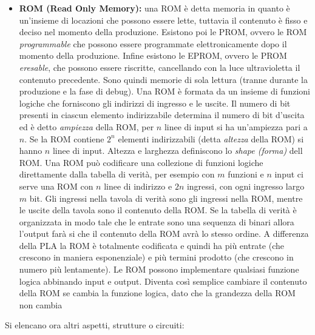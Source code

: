 \documentclass[a4paper,12pt, oneside]{book}
\begin{document}
\begin{itemize}
\item \textbf{ROM (Read Only Memory):} una ROM è detta memoria in quanto è un'insieme di locazioni che possono essere lette, tuttavia il contenuto è fisso e deciso nel momento della produzione. Esistono poi le PROM, ovvero le ROM \textit{programmable} che possono essere programmate elettronicamente dopo il momento della produzione. Infine esistono le EPROM, ovvero le PROM \textit{eresable}, che possono essere riscritte, cancellando con la luce ultravioletta il contenuto precedente. Sono quindi memorie di sola lettura (tranne durante la produzione e la fase di debug). Una ROM è formata da un insieme di funzioni logiche che forniscono gli indirizzi di ingresso e le uscite. Il numero di bit presenti in ciascun elemento indirizzabile  determina il numero di bit d'uscita ed è detto \textit{ampiezza} della ROM, per $n$ linee di input si ha un'ampiezza pari a $n$. Se la ROM contiene $2^n$ elementi indirizzabili (detta \textit{altezza} della ROM) si hanno $n$ linee di input. Altezza e larghezza definiscono lo \textit{shape (forma)} dell ROM. Una ROM può codificare una collezione di funzioni logiche direttamente dalla tabella di verità, per esempio con $m$ funzioni e $n$ input ci serve una ROM con $n$ linee di indirizzo e $2n$ ingressi, con ogni ingresso largo $m$ bit. Gli ingressi nella tavola di verità sono gli ingressi nella ROM, mentre le uscite della tavola sono il contenuto della ROM. Se la tabella di verità è organizzata in modo tale che le entrate sono una sequenza di binari allora l'output farà si che il contenuto della ROM avrà lo stesso ordine. A differenza della PLA la ROM è totalmente codificata e quindi ha più entrate (che crescono in maniera esponenziale) e più termini prodotto (che crescono in numero più lentamente). Le ROM possono implementare qualsiasi funzione logica abbinando input e output. Diventa così semplice cambiare il contenuto della ROM se cambia la funzione logica, dato che la grandezza della ROM non cambia
\end{itemize}
\newpage
Si elencano ora altri aspetti, strutture o circuiti:
\end{document}
